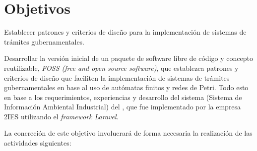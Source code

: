 \section{Objetivos}

Establecer patrones y criterios de diseño para la implementación de sistemas de trámites gubernamentales.

Desarrollar la versión inicial de un paquete de software libre de código y
concepto reutilizable, \textit{FOSS (free and open source software)}, que establezca patrones y criterios de diseño que faciliten la implementación de sistemas de trámites gubernamentales
en base al uso de autómatas finitos
y redes de Petri. Todo
esto en base a los requerimientos, experiencias y desarrollo del sistema
 (Sistema de Información Ambiental Industrial) del , que fue implementado por la empresa
2IES utilizando el \textit{framework Laravel}.

La concreción de este objetivo involucrará de forma necesaria la realización de
las actividades siguientes:

